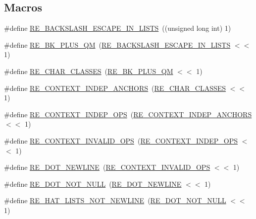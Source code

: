 \subsection*{Macros}
\begin{DoxyCompactItemize}
\item 
\#define \hyperlink{a00092_a45356e84c34c98ed125ea5f75814ccc5}{R\+E\+\_\+\+B\+A\+C\+K\+S\+L\+A\+S\+H\+\_\+\+E\+S\+C\+A\+P\+E\+\_\+\+I\+N\+\_\+\+L\+I\+S\+TS}~((unsigned long int) 1)
\item 
\#define \hyperlink{a00092_a94bdc20e1e83b401d2725902a642aa1e}{R\+E\+\_\+\+B\+K\+\_\+\+P\+L\+U\+S\+\_\+\+QM}~(\hyperlink{a00092_a45356e84c34c98ed125ea5f75814ccc5}{R\+E\+\_\+\+B\+A\+C\+K\+S\+L\+A\+S\+H\+\_\+\+E\+S\+C\+A\+P\+E\+\_\+\+I\+N\+\_\+\+L\+I\+S\+TS} $<$$<$ 1)
\item 
\#define \hyperlink{a00092_a9650e76532d0ae7c8cc3ea5eb6dee6e7}{R\+E\+\_\+\+C\+H\+A\+R\+\_\+\+C\+L\+A\+S\+S\+ES}~(\hyperlink{a00092_a94bdc20e1e83b401d2725902a642aa1e}{R\+E\+\_\+\+B\+K\+\_\+\+P\+L\+U\+S\+\_\+\+QM} $<$$<$ 1)
\item 
\#define \hyperlink{a00092_a544bf7770a00eaaa62374a00fea08a2d}{R\+E\+\_\+\+C\+O\+N\+T\+E\+X\+T\+\_\+\+I\+N\+D\+E\+P\+\_\+\+A\+N\+C\+H\+O\+RS}~(\hyperlink{a00092_a9650e76532d0ae7c8cc3ea5eb6dee6e7}{R\+E\+\_\+\+C\+H\+A\+R\+\_\+\+C\+L\+A\+S\+S\+ES} $<$$<$ 1)
\item 
\#define \hyperlink{a00092_aa96ee57fb2be85936dbb14f2b4c44b50}{R\+E\+\_\+\+C\+O\+N\+T\+E\+X\+T\+\_\+\+I\+N\+D\+E\+P\+\_\+\+O\+PS}~(\hyperlink{a00092_a544bf7770a00eaaa62374a00fea08a2d}{R\+E\+\_\+\+C\+O\+N\+T\+E\+X\+T\+\_\+\+I\+N\+D\+E\+P\+\_\+\+A\+N\+C\+H\+O\+RS} $<$$<$ 1)
\item 
\#define \hyperlink{a00092_ae344a4e6129c8d549a88cd5f45e86adb}{R\+E\+\_\+\+C\+O\+N\+T\+E\+X\+T\+\_\+\+I\+N\+V\+A\+L\+I\+D\+\_\+\+O\+PS}~(\hyperlink{a00092_aa96ee57fb2be85936dbb14f2b4c44b50}{R\+E\+\_\+\+C\+O\+N\+T\+E\+X\+T\+\_\+\+I\+N\+D\+E\+P\+\_\+\+O\+PS} $<$$<$ 1)
\item 
\#define \hyperlink{a00092_a405fe43871f2df60407b3c8272f4624c}{R\+E\+\_\+\+D\+O\+T\+\_\+\+N\+E\+W\+L\+I\+NE}~(\hyperlink{a00092_ae344a4e6129c8d549a88cd5f45e86adb}{R\+E\+\_\+\+C\+O\+N\+T\+E\+X\+T\+\_\+\+I\+N\+V\+A\+L\+I\+D\+\_\+\+O\+PS} $<$$<$ 1)
\item 
\#define \hyperlink{a00092_a30d6a2fb42df1a210e830f3cd3f06977}{R\+E\+\_\+\+D\+O\+T\+\_\+\+N\+O\+T\+\_\+\+N\+U\+LL}~(\hyperlink{a00092_a405fe43871f2df60407b3c8272f4624c}{R\+E\+\_\+\+D\+O\+T\+\_\+\+N\+E\+W\+L\+I\+NE} $<$$<$ 1)
\item 
\#define \hyperlink{a00092_aad6ec0e3f8f0bb3c53213e3f9ca77d8e}{R\+E\+\_\+\+H\+A\+T\+\_\+\+L\+I\+S\+T\+S\+\_\+\+N\+O\+T\+\_\+\+N\+E\+W\+L\+I\+NE}~(\hyperlink{a00092_a30d6a2fb42df1a210e830f3cd3f06977}{R\+E\+\_\+\+D\+O\+T\+\_\+\+N\+O\+T\+\_\+\+N\+U\+LL} $<$$<$ 1)

\end{DoxyCompactItemize}
